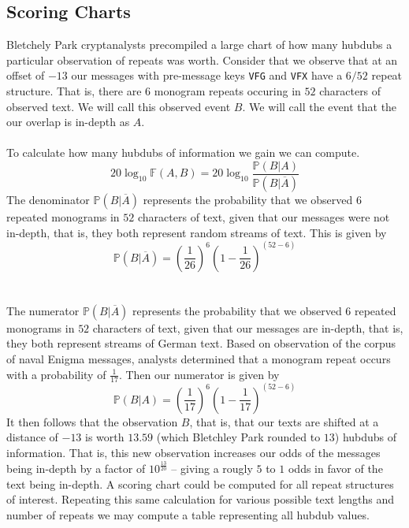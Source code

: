 \subsection{Scoring Charts}
Bletchely Park cryptanalysts precompiled a large chart of how many
hubdubs a particular observation of repeats was worth. Consider
that we observe that at an offset of $-13$ our messages with
pre-message keys \texttt{VFG} and \texttt{VFX} have a $6/52$ repeat
structure. That is, there are $6$ monogram repeats occuring in $52$
characters of observed text. We will call this observed event $B$.
We will call the event that the our overlap is in-depth as $A$.
\\\\To calculate how many hubdubs of information we gain we can compute.
\[
	20\log_{10}\mathbb{F}(A,B) =
	20\log_{10}\frac{\mathbb{P}(B|A)}{\mathbb{P}(B|\overline{A})}
\]
The denominator $\mathbb{P}(B|\overline{A})$ represents the
probability that we observed $6$ repeated monograms in $52$
characters of text, given that our messages were not in-depth, that
is, they both represent random streams of text. This is given by
\[
	\mathbb{P}(B|\overline{A}) = (\frac{1}{26})^6(1-\frac{1}{26})^{(52-6)}
\]
\\\\The numerator $\mathbb{P}(B|\overline{A})$ represents the
probability that we observed $6$ repeated monograms in $52$
characters of text, given that our messages are in-depth, that is,
they both represent streams of German text. Based on observation of
the corpus of naval Enigma messages, analysts determined that a
monogram repeat occurs with a probability of $\frac{1}{17}$. Then
our numerator is given by
\[
	\mathbb{P}(B|A) = (\frac{1}{17})^6(1-\frac{1}{17})^{(52-6)}
\]
It then follows that the observation $B$, that is, that our texts
are shifted at a distance of $-13$ is worth $13.59$ (which
Bletchley Park rounded to $13$) hubdubs of information. That is,
this new observation increases our odds of the messages being
in-depth by a factor of $10^\frac{13}{20}$ -- giving a rougly $5$
to $1$ odds in favor of the text being in-depth. A scoring chart
could be computed for all repeat structures of interest. Repeating
this same calculation for various possible text lengths and number
of repeats we may compute a table representing all hubdub values.
